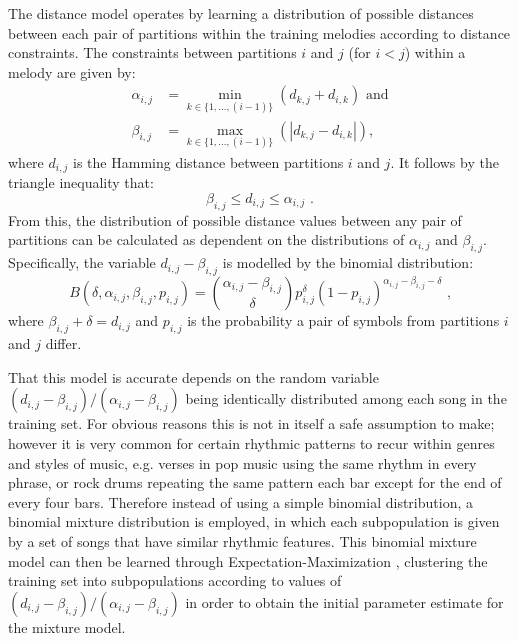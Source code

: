 \documentclass[ author={Stephen Livermore-Tozer},
				supervisor={Dr. Peter Flach},
				degree={MEng},
				title={Performing Algorithmic Co-composition Using Machine Learning},
				subtitle={},
				type={research},
				year={2016} ]{dissertation}
\begin{document}
	
	The distance model operates by learning a distribution of possible distances between each pair of partitions within the training melodies according to distance constraints. The constraints between partitions $i$ and $j$ (for $i<j$) within a melody are given by:
	\begin{equation*}
		\begin{split}
		\alpha_{i,j} &= \min_{k \in \{1,\dots,(i-1)\}} (d_{k,j} + d_{i,k}) \text{ and} \\
		\beta_{i,j} &= \max_{k \in \{1,\dots,(i-1)\}} (|d_{k,j} - d_{i,k}|),
		\end{split}
	\end{equation*}
	where $d_{i,j}$ is the Hamming distance between partitions $i$ and $j$. It follows by the triangle inequality that:
	$$\beta_{i,j} \leq d_{i,j} \leq \alpha_{i,j} \text{ .}$$
	From this, the distribution of possible distance values between any pair of partitions can be calculated as dependent on the distributions of $\alpha_{i,j}$ and $\beta_{i,j}$. Specifically, the variable $d_{i,j} - \beta_{i,j}$ is modelled by the binomial distribution:
	$$B(\delta, \alpha_{i,j}, \beta_{i,j}, p_{i,j}) = \binom{\alpha_{i,j} - \beta_{i,j}}{\delta} p_{i,j}^\delta (1-p_{i,j})^{\alpha_{i,j}-\beta_{i,j}-\delta} \text{ ,}$$
	where $\beta_{i,j} + \delta = d_{i,j}$ and $p_{i,j}$ is the probability a pair of symbols from partitions $i$ and $j$ differ. 
	
	That this model is accurate depends on the random variable $(d_{i,j}-\beta_{i,j})/(\alpha_{i,j}-\beta_{i,j})$ being identically distributed among each song in the training set. For obvious reasons this is not in itself a safe assumption to make; however it is very common for certain rhythmic patterns to recur within genres and styles of music, e.g. verses in pop music using the same rhythm in every phrase, or rock drums repeating the same pattern each bar except for the end of every four bars. Therefore instead of using a simple binomial distribution, a binomial mixture distribution is employed, in which each subpopulation is given by a set of songs that have similar rhythmic features. This binomial mixture model can then be learned through Expectation-Maximization \cite{bilmes1998gentle}, clustering the training set into subpopulations according to values of $(d_{i,j}-\beta_{i,j})/(\alpha_{i,j}-\beta_{i,j})$ in order to obtain the initial parameter estimate for the mixture model.
	
\end{document}
